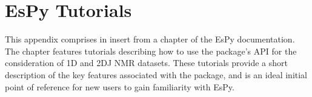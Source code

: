 \chapter{\acs{EsPy} Tutorials}
\label{chap:inserts}
This appendix comprises in insert from a chapter of the \ac{EsPy}
documentation.  The chapter features tutorials describing how to use the
package's \ac{API} for the consideration of \ac{1D} and \ac{2DJ} \ac{NMR}
datasets. These tutorials provide a short description of the key features
associated with the package, and is an ideal initial point of reference for new
users to gain familiarity with \ac{EsPy}.

\newpage
{}
{}


{}

